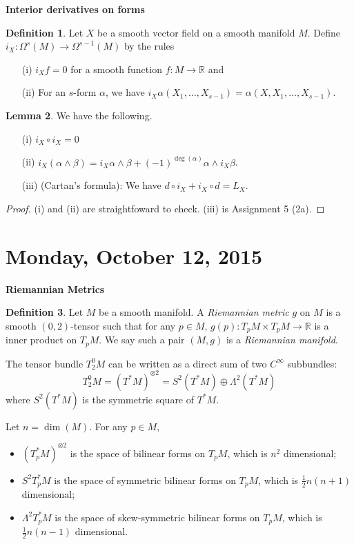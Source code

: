 \documentclass{amsart}
\numberwithin{equation}{section}
\newcommand{\bR}{\mathbb{R}}
\theoremstyle{definition}
\newtheorem{definition}{Definition} [section]
\theoremstyle{theorem}
\newtheorem{lemma}[definition]{Lemma}
\begin{document}
\noindent
{\bf \large Interior derivatives on forms}

\begin{definition}
Let $X$ be a smooth vector field on a smooth manifold $M$. Define $i_X : \Omega^s(M) \to \Omega^{s-1}(M)$ by the rules 
\begin{enumerate}
\item[(i)] $i_Xf = 0$ for a smooth function $f : M \to \mathbb{R}$ and 
\item[(ii)] For an $s$-form $\alpha$, we have $i_X\alpha(X_1, \ldots, X_{s-1}) = \alpha(X, X_1, \ldots, X_{s-1})$. 
\end{enumerate}
\end{definition}

\begin{lemma}
We have the following. 
\begin{enumerate}
\item[(i)] $i_X \circ i_X = 0$
\item[(ii)] $i_X(\alpha \wedge \beta) = i_X\alpha \wedge \beta + (-1)^{\deg(\alpha)} \alpha \wedge i_X\beta$.
 \item[(iii)] (Cartan's formula): We have $d \circ i_X + i_X \circ d = L_X$. 
\end{enumerate}
\end{lemma}

\begin{proof}
(i) and (ii) are straightfoward to check. (iii) is Assignment 5 (2a).
\end{proof}


\section{Monday, October 12, 2015} 

\noindent
{\bf \large Riemannian Metrics}

\begin{definition}
Let $M$ be a smooth manifold. A {\em Riemannian metric} $g$ on $M$ is a smooth $(0,2)$-tensor such that 
for any $p\in M$, $g(p) : T_pM \times T_pM \to \bR$ is a inner product on $T_pM$. 
We say such a pair $(M,g)$ is a {\em Riemannian manifold}.
\end{definition}


The tensor bundle $T^0_2M$ can be written as a direct sum of two  $C^\infty$ subbundles:
$$
T^0_2 M = (T^*M)^{\otimes 2} = S^2(T^*M)\oplus \Lambda^2(T^*M)
$$
where $S^2(T^*M)$ is the symmetric square of $T^*M$.

Let $n=\dim(M)$. For any $p\in M$, 
\begin{itemize}
\item $(T_p^*M)^{\otimes 2}$ is the space of bilinear forms on $T_pM$, which is $n^2$ dimensional;
\item $S^2T_p^*M$ is the space of symmetric bilinear forms on $T_pM$, which is $\frac{1}{2}n(n+1)$ dimensional; 
\item $\Lambda^2 T_p^*M$ 
is the space of skew-symmetric bilinear forms on $T_pM$, which is $\frac{1}{2}n(n-1)$ 
dimensional. 
\end{itemize}
\end{document}
